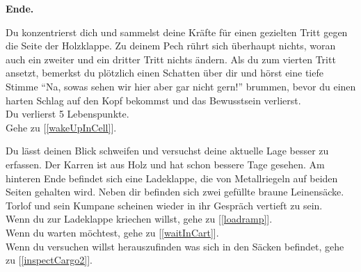 \textbf{Ende.}


Du konzentrierst dich und sammelst deine Kräfte für einen gezielten Tritt gegen die Seite der Holzklappe. Zu deinem Pech rührt sich überhaupt nichts, woran auch ein zweiter und ein dritter Tritt nichts ändern. Als du zum vierten Tritt ansetzt, bemerkst du plötzlich einen Schatten über dir und hörst eine tiefe Stimme ``Na, sowas sehen wir hier aber gar nicht gern!'' brummen, bevor du einen harten Schlag auf den Kopf bekommst und das Bewusstsein verlierst.\\
Du verlierst 5 Lebenspunkte.
\\Gehe zu [\ref{wakeUpInCell}].

Du lässt deinen Blick schweifen und versuchst deine aktuelle Lage besser zu erfassen. Der Karren ist aus Holz und hat schon bessere Tage gesehen. Am hinteren Ende befindet sich eine Ladeklappe, die von Metallriegeln auf beiden Seiten gehalten wird. Neben dir befinden sich zwei gefüllte braune Leinensäcke. Torlof und sein Kumpane scheinen wieder in ihr Gespräch vertieft zu sein.
\\Wenn du zur Ladeklappe kriechen willst, gehe zu [\ref{loadramp}].
\\Wenn du warten möchtest, gehe zu [\ref{waitInCart}].
\\Wenn du versuchen willst herauszufinden was sich in den Säcken befindet, gehe zu [\ref{inspectCargo2}].
